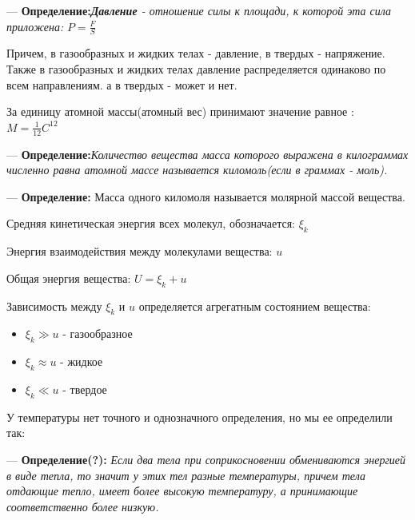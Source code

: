 \documentclass[12pt,a4paper]{report}
\begin{document}
\vspace{5px}

--- \textbf{Определение:}\textit{\textbf{Давление} - отношение силы к площади, к которой эта сила приложена:} $P = \frac{F}{S}$

\vspace{5px}

Причем, в газообразных и жидких телах - давление, в твердых - напряжение. Также в газообразных и жидких телах давление распределяется одинаково по всем направлениям. а в твердых - может и нет.

\vspace{5px}

За единицу атомной массы(атомный вес) принимают значение равное : $ M = \frac{1}{12}C^{12}$

\vspace{5px}

--- \textbf{Определение:}\textit{Количество вещества масса которого выражена в килограммах численно равна атомной массе называется киломоль(если в граммах - моль).}

--- \textbf{Определение:} Масса одного киломоля называется молярной массой вещества.

\vspace{5px}

Средняя кинетическая энергия всех молекул, обозначается: $\xi_k$

\vspace{5px}

Энергия взаимодействия между молекулами вещества: $u$

\vspace{5px}

Общая энергия вещества: $U = \xi_k + u$

\newpage

Зависимость между $\xi_k$ и $u$ определяется агрегатным состоянием вещества:
\begin{itemize}
    \item $\xi_k \gg u$ - газообразное
    \item $\xi_k \approx u$ - жидкое
    \item $\xi_k \ll u$ - твердое
\end{itemize}
У температуры нет точного и однозначного определения, но мы ее определили так:

\vspace{5px}

--- \textbf{Определение(?):} \textit{ Если два тела при соприкосновении обмениваются энергией в виде тепла, то значит у этих тел разные температуры, причем тела отдающие тепло, имеет более высокую температуру, а принимающие соответственно более низкую.}
\end{document}
